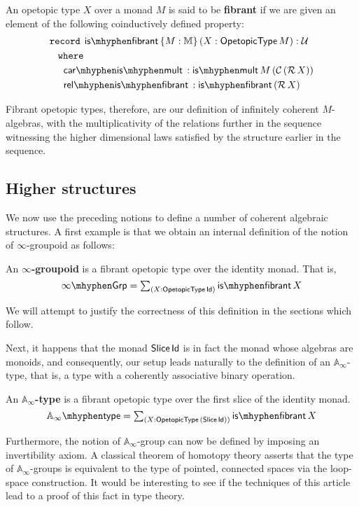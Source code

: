 \begin{defn}
  An opetopic type $X$ over a monad $M$ is said to be \textbf{fibrant}
  if we are given an element of the following coinductively defined
  property:
  \begin{align*}
    &\texttt{record}\hspace{1ex} \isfibrant \{M : \MM\}\, (X : \OpType M) : \UU\\
    &\hspace{.3cm} \texttt{where} \\
    &\hspace{.5cm} \carmult : \ismult M\, (\Car (\Rel X)) \\
    &\hspace{.5cm} \relfib : \isfibrant (\Rel X)
  \end{align*}
\end{defn}
Fibrant opetopic types, therefore, are our definition of infinitely
coherent $M$-algebras, with the multiplicativity of the relations
further in the sequence witnessing the higher dimensional laws
satisfied by the structure earlier in the sequence.

\subsection{Higher structures}
\label{sec:higher-structures}

We now use the preceding notions to define a number of coherent
algebraic structures.  A first example is that we obtain an internal
definition of the notion of $\infty$-groupoid as follows: 
\begin{defn}
  An \textbf{$\infty$-groupoid} is a fibrant opetopic type over
  the identity monad.  That is,
\[ \ooGrp = \dsum{X : \OpType \Id} \isfibrant X \] 
\end{defn}
\noindent We will attempt to justify the correctness of this
definition in the sections which follow.

Next, it happens that the monad $\mathsf{Slice}\, \mathsf{Id}$ is in fact the monad
whose algebras are monoids, and consequently, our setup leads
naturally to the definition of an $\mathbb{A}_\infty$-type, that is, a
type with a coherently associative binary operation.

\begin{defn}
  An \textbf{$\mathbb{A}_\infty$-type} is a fibrant opetopic type
  over the first slice of the identity monad.
  \[ \mathbb{A}_\infty\mhyphen\mathsf{type} = \dsum{X : \OpType
      (\Slice \Id)} \isfibrant X \]
\end{defn}
Furthermore, the notion of $\mathbb{A}_\infty$-group can now be
defined by imposing an invertibility axiom.  A classical theorem of
homotopy theory asserts that the type of $\mathbb{A}_\infty$-groups is
equivalent to the type of pointed, connected spaces via the loop-space
construction.  It would be interesting to see if the techniques of
this article lead to a proof of this fact in type theory.


